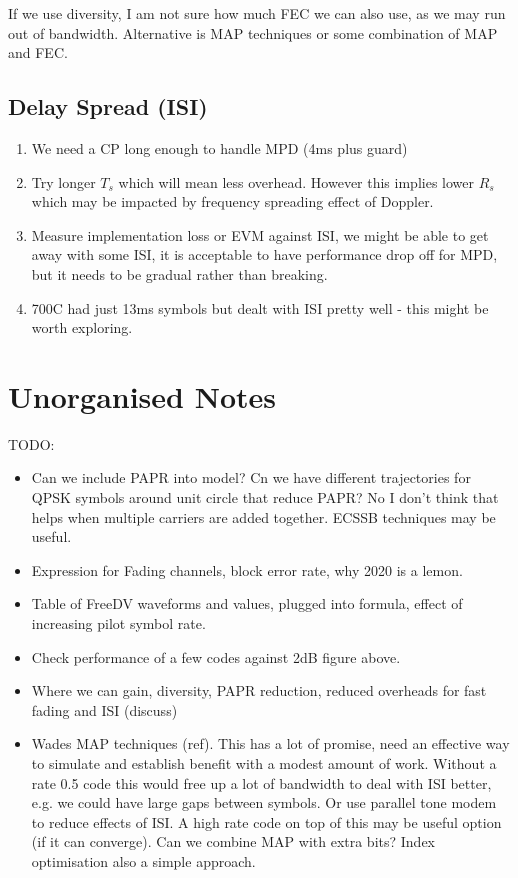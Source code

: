 \documentclass{article}
\begin{document}
If we use diversity, I am not sure how much FEC we can also use, as we may run out of bandwidth.  Alternative is MAP techniques or some combination of MAP and FEC.

\subsection{Delay Spread (ISI)}

\begin{enumerate}
\item We need a CP long enough to handle MPD (4ms plus guard)
\item Try longer $T_s$ which will mean less overhead. However this implies lower $R_s$ which may be impacted by frequency spreading effect of Doppler.
\item Measure implementation loss or EVM against ISI, we might be able to get away with some ISI, it is acceptable to have performance drop off for MPD, but it needs to be gradual rather than breaking.
\item 700C had just 13ms symbols but dealt with ISI pretty well - this might be worth exploring.
\end{enumerate}

\section{Unorganised Notes}

TODO:

\begin{itemize}
\item Can we include PAPR into model? Cn we have different trajectories for QPSK symbols around unit circle that reduce PAPR?  No I don't think that helps when multiple carriers are added together.  ECSSB techniques may be useful.
\item Expression for Fading channels, block error rate, why 2020 is a lemon.
\item Table of FreeDV waveforms and values, plugged into formula, effect of increasing pilot symbol rate.
\item Check performance of a few codes against 2dB figure above.
\item Where we can gain, diversity, PAPR reduction, reduced overheads for fast fading and ISI (discuss)
\item Wades MAP techniques (ref).  This has a lot of promise, need an effective way to simulate and establish benefit with a modest amount of work.  Without a rate 0.5 code this would free up a lot of bandwidth to deal with ISI better, e.g. we could have large gaps between symbols.  Or use parallel tone modem to reduce effects of ISI.  A high rate code on top of this may be useful option (if it can converge).   Can we combine MAP with extra bits?  Index optimisation also a simple approach.
\end{itemize} 



\end{document}
